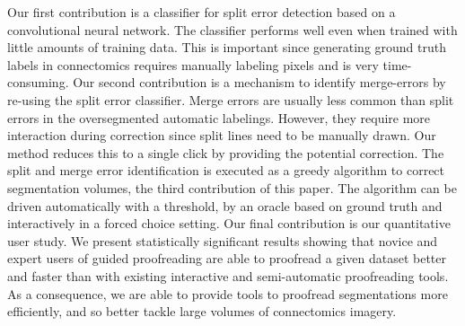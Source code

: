 Our first contribution is a classifier for split error detection based on a convolutional neural network. The classifier performs well even when trained with little amounts of training data. This is important since generating ground truth labels in connectomics requires manually labeling pixels and is very time-consuming. Our second contribution is a mechanism to identify merge-errors by re-using the split error classifier. Merge errors are usually less common than split errors in the oversegmented automatic labelings. However, they require more interaction during correction since split lines need to be manually drawn. Our method reduces this to a single click by providing the potential correction. The split and merge error identification is executed as a greedy algorithm to correct segmentation volumes, the third contribution of this paper. The algorithm can be driven automatically with a threshold, by an oracle based on ground truth and interactively in a forced choice setting. Our final contribution is our quantitative user study. We present statistically significant results showing that novice and expert users of guided proofreading are able to proofread a given dataset better and faster than with existing interactive and semi-automatic proofreading tools. As a consequence, we are able to provide tools to proofread segmentations more efficiently, and so better tackle large volumes of connectomics imagery.



